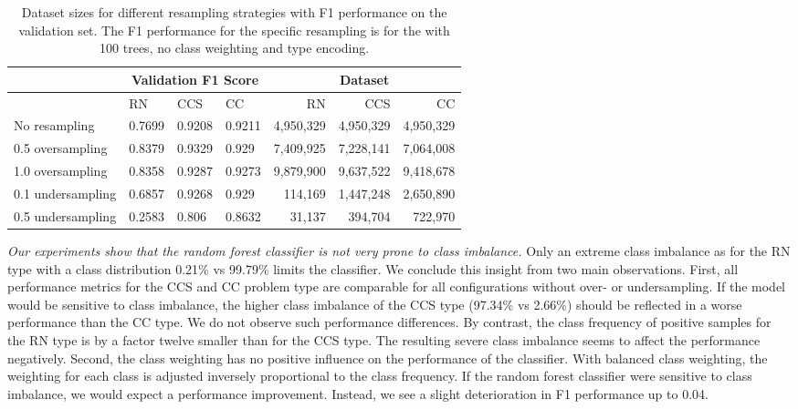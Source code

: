 \begin{table}[]
\tabcolsep=0.11cm
\begin{tabularx}{\textwidth}{lXXX|rrr}
\toprule
                    & \multicolumn{3}{c}{Validation F1 Score} & \multicolumn{3}{c}{Dataset}   \\ \midrule
                    & RN        & CCS        & CC     & RN            & CCS         & CC          \\ \midrule
No resampling     &  0.7699   &  0.9208    &  0.9211  &  4,950,329    & 4,950,329   & 4,950,329   \\ \midrule
0.5 oversampling  &  0.8379   &  0.9329    &  0.929   &  7,409,925    & 7,228,141   & 7,064,008   \\
1.0 oversampling  &  0.8358   &  0.9287    &  0.9273  &  9,879,900    & 9,637,522   & 9,418,678   \\ \midrule
0.1 undersampling &  0.6857   &  0.9268    &  0.929   &  114,169      & 1,447,248   & 2,650,890   \\
0.5 undersampling &  0.2583   &  0.806     &  0.8632  &  31,137       & 394,704     & 722,970     \\ \bottomrule
\end{tabularx}
\caption{Dataset sizes for different resampling strategies with F1 performance on the validation set. The F1 performance for the specific resampling is for the  with 100 trees, no class weighting and type encoding.}
\label{tab:resampling_size_performance_rf}
\end{table}

\textit{Our experiments show that the random forest classifier is not very prone to class imbalance.} Only an extreme class imbalance as for the RN type with a class distribution 0.21\% vs 99.79\% limits the classifier. We conclude this insight from two main observations. 
First, all performance metrics for the CCS and CC problem type are comparable for all configurations without over- or undersampling. If the model would be sensitive to class imbalance, the higher class imbalance of the CCS type (97.34\% vs 2.66\%) should be reflected in a worse performance than the CC type. We do not observe such performance differences. By contrast, the class frequency of positive samples for the RN type is by a factor twelve smaller than for the CCS type. The resulting severe class imbalance seems to affect the performance negatively. 
Second, the class weighting has no positive influence on the performance of the classifier. With balanced class weighting, the weighting for each class is adjusted inversely proportional to the class frequency. If the random forest classifier were sensitive to class imbalance, we would expect a performance improvement. Instead, we see a slight deterioration in F1 performance up to 0.04.


